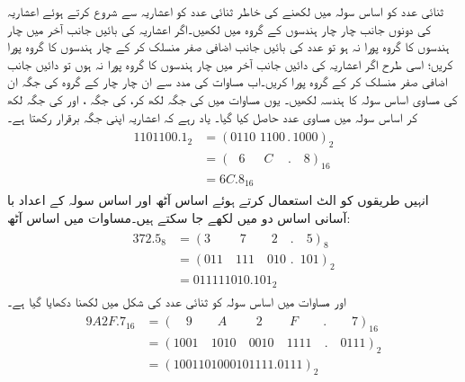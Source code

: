 	ثنائی عدد کو اساس سولہ میں لکھنے کی خاطر ثنائی عدد کو اعشاریہ سے شروع کرتے ہوئے اعشاریہ کی  دونوں جانب  چار چار ہندسوں کے گروہ میں لکھیں۔اگر اعشاریہ کی بائیں جانب آخر میں چار ہندسوں کا گروہ پورا نہ ہو تو عدد کی  بائیں جانب اضافی  صفر منسلک  کر کے  چار ہندسوں  کا گروہ  پورا کریں؛ اسی طرح  اگر اعشاریہ کی دائیں جانب آخر میں چار ہندسوں کا گروہ  پورا نہ ہوں تو دائیں جانب  اضافی صفر منسلک کر کے گروہ پورا کریں۔اب مساوات     کی مدد سے ان چار چار کے گروہ کی جگہ ان کی  مساوی اساس سولہ کا ہندسہ لکھیں۔ یوں مساوات    میں   کی جگہ  لکھ کر،   کی جگہ ،  اور     کی جگہ     لکھ کر   اساس سولہ میں مساوی   عدد حاصل کیا گیا۔ یاد رہے کہ اعشاریہ اپنی جگہ برقرار رکھتا ہے۔
\begin{gather}
\begin{aligned}\label{مساوات_ثنائی_سولہ_تبدیل}
1101100.1_2&=(0110  \,\,1100\,  . \, 1000)_2\\
&=(\phantom{0}\, 6\,\,\quad \,C\quad\, .\quad 8)_{16}\\
&=6C.8_{16}
\end{aligned}
\end{gather}
	انہیں طریقوں کو الٹ استعمال کرتے ہوئے اساس آٹھ اور اساس سولہ کے اعداد با آسانی اساس دو میں لکھے جا سکتے ہیں۔مساوات    میں اساس آٹھ:
 \begin{gather}
 \begin{aligned}\label{مساوات_ثنائی_آٹھ_تبدیل_اساس}
 372.5_8&=(3\quad\quad \,\, 7\quad\quad  2\quad  . \quad  5)_8\\
 &=(011\quad 111 \quad 010\,\,. \,\,\, 101)_2\\
 &=011111010.101_2
 \end{aligned}
 \end{gather}
 اور مساوات   میں اساس سولہ کو ثنائی عدد کی شکل میں لکھنا دکھایا گیا ہے۔ 
\begin{gather}
 \begin{aligned}\label{مساوات_ثنائی_سولہ_تبدیل_اساس}
 9A2F.7_{16}&=(\quad 9 \quad \quad A\quad\quad  \,\, 2\quad \quad \, F\quad \quad . \quad \quad 7)_{16}\\
 &=(1001\quad 1010\quad 0010\quad 1111\quad . \quad 0111)_2\\
 &=(1001101000101111.0111)_2
 \end{aligned}
 \end{gather}
